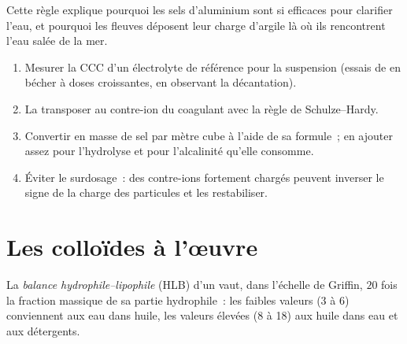 Cette règle explique pourquoi les sels d'aluminium sont si efficaces pour
clarifier l'eau, et pourquoi les fleuves déposent leur charge d'argile là
où ils rencontrent l'eau salée de la mer.

\begin{method}\label{met:b3:colloids:coagulant-dose}
\begin{enumerate}
  \item Mesurer la CCC d'un électrolyte de référence pour la suspension
        (essais de  en bécher à doses croissantes, en
        observant la décantation).
  \item La transposer au contre-ion du coagulant avec la règle de
        Schulze--Hardy.
  \item Convertir en masse de sel par mètre cube à l'aide de sa formule~;
        en ajouter assez pour l'hydrolyse et pour l'alcalinité qu'elle
        consomme.
  \item Éviter le surdosage~: des contre-ions fortement chargés peuvent
        inverser le signe de la charge des particules et les restabiliser.
\end{enumerate}
\end{method}

\section{Les colloïdes à l'œuvre}

\begin{definition}\label{def:b3:colloids:hlb}
La \emph{balance hydrophile--lipophile}
(HLB) d'un  vaut, dans l'échelle de Griffin, $20$
fois la fraction massique de sa partie hydrophile~: les faibles valeurs
(3 à 6) conviennent aux  eau dans huile, les valeurs élevées
(8 à 18) aux  huile dans eau et aux détergents.
\end{definition}

